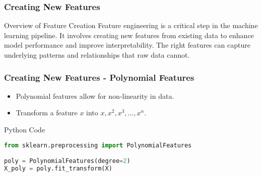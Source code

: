\documentclass[aspectratio=169]{beamer}
\begin{document}
\begin{frame}[fragile]
    \frametitle{Creating New Features}
    \begin{block}{Overview of Feature Creation}
        Feature engineering is a critical step in the machine learning pipeline. It involves creating new features from existing data to enhance model performance and improve interpretability. The right features can capture underlying patterns and relationships that raw data cannot.
    \end{block}
\end{frame}

\begin{frame}[fragile]
    \frametitle{Creating New Features - Polynomial Features}
    \begin{itemize}
        \item Polynomial features allow for non-linearity in data.
        \item Transform a feature \(x\) into \(x, x^2, x^3, \ldots, x^n\).
    \end{itemize}
    
    
    \begin{block}{Python Code}
        \begin{lstlisting}[language=Python]
from sklearn.preprocessing import PolynomialFeatures

poly = PolynomialFeatures(degree=2)
X_poly = poly.fit_transform(X)
        \end{lstlisting}
    \end{block}
\end{frame}
\end{document}
